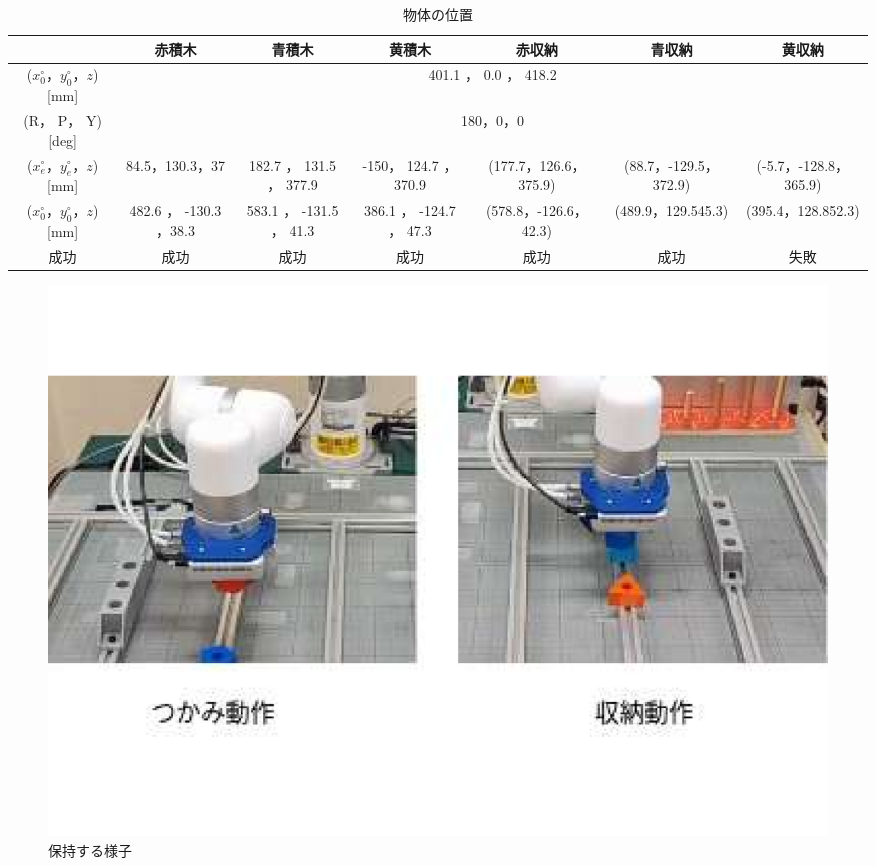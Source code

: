 \begin{table}[h]
  \centering
  \scriptsize %
  \caption{物体の位置}
  \begin{tabular}{|c|c|c|c|c|c|c|}
    \hline
                                               & 赤積木                                       & 青積木                  & 黄積木                  & 赤収納                & 青収納                & 黄収納                \\ \hline
    \hline
    ($x_{0}^{\circ}， y_{0}^{\circ}， z$) [mm] & \multicolumn{6}{|c|}{401.1 ， 0.0 ， 418.2 }                                                                                                                             \\ \hline
    (R， P， Y) [deg]                          & \multicolumn{6}{|c|}{180，0，0             }                                                                                                                             \\ \hline
    ($x_{e}^{\circ}， y_{e}^{\circ}， z$) [mm] & 84.5，130.3，37                              & 182.7 ， 131.5 ， 377.9 & -150， 124.7 ， 370.9   & (177.7，126.6，375.9) & (88.7，-129.5，372.9) & (-5.7，-128.8，365.9) \\ \hline
    ($x_{0}^{\circ}， y_{0}^{\circ}， z$) [mm] & 482.6 ， -130.3 ，38.3                       & 583.1 ， -131.5 ， 41.3 & 386.1 ， -124.7 ， 47.3 & (578.8，-126.6，42.3) & (489.9，129.545.3)    & (395.4，128.852.3)    \\ \hline
    成功                                       & 成功                                         & 成功                    & 成功                    & 成功                  & 成功                  & 失敗                  \\ \hline 
    
  \end{tabular}
\end{table}

\begin{figure}[H]
  \centering
  \includegraphics[scale=0.5]{sozai/8.pdf}
  \caption{保持する様子}
\end{figure}

